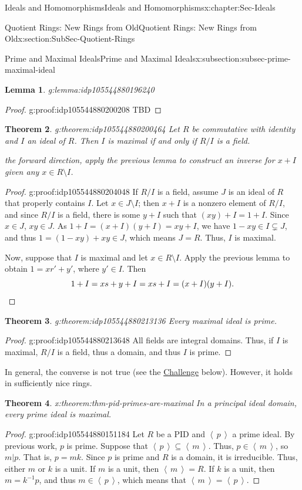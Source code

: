 \documentclass[oneside,10pt,]{book}
\numberwithin{equation}{section}
\newcommand{\qedhere}{\relax}
\newcommand{\ideal}[1]{\left\langle\, #1 \,\right\rangle}
\newtheorem{theorem}{Theorem}[section]
\newtheorem{lemma}[theorem]{Lemma}
\begin{document}
\begin{chapterptx}{Ideals and Homomorphisms}{}{Ideals and Homomorphisms}{}{}{x:chapter:Sec-Ideals}
\begin{sectionptx}{Quotient Rings: New Rings from Old}{}{Quotient Rings: New Rings from Old}{}{}{x:section:SubSec-Quotient-Rings}
\begin{subsectionptx}{Prime and Maximal Ideals}{}{Prime and Maximal Ideals}{}{}{x:subsection:subsec-prime-maximal-ideal}
\begin{lemma}{}{}{g:lemma:idp105544880196240}
\end{lemma}
\begin{proof}{}{g:proof:idp105544880200208}
TBD\end{proof}
\begin{theorem}{}{}{g:theorem:idp105544880200464}%
Let \(R\) be commutative with identity and \(I\) an ideal of \(R\). Then \(I\) is maximal if and only if \(R/I\) is a field.%
\par\smallskip%
\noindentFor the forward direction, apply the previous lemma to construct an inverse for \(x+I\) given any \(x\in R\setminus I\).%
\end{theorem}
\begin{proof}{}{g:proof:idp105544880204048}
If \(R/I\) is a field, assume \(J\) is an ideal of \(R\) that properly contains \(I\). Let \(x\in J\setminus I\); then \(x+I\) is a nonzero element of \(R/I\), and since \(R/I\) is a field, there is some \(y+I\) such that \((xy)+I = 1+I\). Since \(x\in J\), \(xy\in J\). As \(1+I = (x+I)(y+I) = xy+I\), we have \(1-xy\in I\subsetneq J\), and thus \(1 = (1-xy)+xy \in J\), which means \(J = R\). Thus, \(I\) is maximal.%
\par
Now, suppose that \(I\) is maximal and let \(x\in R\setminus I\). Apply the previous lemma to obtain \(1 = xr' + y'\), where \(y'\in I\). Then%
\begin{equation*}
1 + I = xs+y + I = xs + I = (x+I)(y+I).\qedhere
\end{equation*}
%
\end{proof}
\begin{theorem}{}{}{g:theorem:idp105544880213136}%
Every maximal ideal is prime.%
\end{theorem}
\begin{proof}{}{g:proof:idp105544880213648}
All fields are integral domains. Thus, if \(I\) is maximal, \(R/I\) is a field, thus a domain, and thus \(I\) is prime.%
\end{proof}
In general, the converse is not true (see the \hyperref[x:assemblage:challenge-nonmaximal-prime]{Challenge} below). However, it holds in sufficiently nice rings.%
\begin{theorem}{}{}{x:theorem:thm-pid-primes-are-maximal}%
In a principal ideal domain, every prime ideal is maximal.%
\end{theorem}
\begin{proof}{}{g:proof:idp105544880151184}
Let \(R\) be a PID and \(\ideal{p}\) a prime ideal. By previous work, \(p\) is prime. Suppose that \(\ideal{p} \subseteq \ideal{m}\). Thus, \(p\in \ideal{m}\), so \(m|p\). That is, \(p = mk\). Since \(p\) is prime and \(R\) is a domain, it is irreducible. Thus, either \(m\) or \(k\) is a unit. If \(m\) is a unit, then \(\ideal{m} = R\). If \(k\) is a unit, then \(m = k^{-1} p\), and thus \(m\in \ideal{p}\), which means that \(\ideal{m} = \ideal{p}\).%

\end{proof}
\end{subsectionptx}
\end{sectionptx}
\end{chapterptx}
\end{document}
